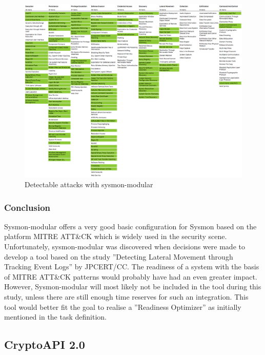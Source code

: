 \begin{figure}[H]
    \centering
    \includegraphics[width=0.9\linewidth]{assets/sysmon-modular/sysmon-modular.png}
    \caption{Detectable attacks with sysmon-modular}\label{fig:sysmonmodular}
\end{figure}

\subsubsection{Conclusion}
Sysmon-modular offers a very good basic configuration for Sysmon based on the platform MITRE ATT\&CK which is widely used in the security scene. Unfortunately, sysmon-modular was discovered when decisions were made to develop a tool based on the study ''Detecting Lateral Movement through Tracking Event Logs'' by JPCERT/CC. The readiness of a system with the basis of MITRE ATT\&CK patterns would probably have had an even greater impact. However, Sysmon-modular will most likely not be included in the tool during this study, unless there are still enough time reserves for such an integration. This tool would better fit the goal to realise a ''Readiness Optimizer'' as initially mentioned in the task definition.



\subsection{CryptoAPI 2.0} \label{CAPI2}
